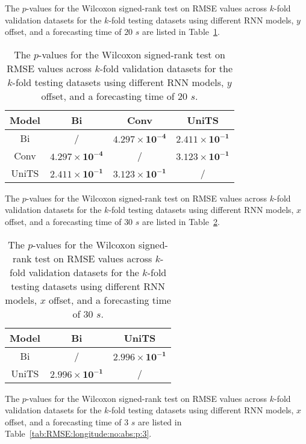 The $p$-values for the Wilcoxon signed-rank test on RMSE values across $k$-fold validation datasets for the $k$-fold testing datasets using different RNN models, $y$ offset, and a forecasting time of $20$ $s$ are listed in Table~\ref{tab:RMSE:latitude:no:abs:p:20}.

\begin{table}[!ht]
	\centering
	\begin{tabular}{|c|c|c|c|}
		\hline
		Model & Bi & Conv & UniTS \\ \hline
		Bi & / & $\mathbf{4.297 \times 10^{-4}}$ & $\mathbf{2.411 \times 10^{-1}}$ \\ \hline
		Conv & $\mathbf{4.297 \times 10^{-4}}$ & / & $\mathbf{3.123 \times 10^{-1}}$ \\ \hline
		UniTS & $\mathbf{2.411 \times 10^{-1}}$ & $\mathbf{3.123 \times 10^{-1}}$ & / \\ \hline
	\end{tabular}
	\caption{The $p$-values for the Wilcoxon signed-rank test on RMSE values across $k$-fold validation datasets for the $k$-fold testing datasets using different RNN models, $y$ offset, and a forecasting time of $20$ $s$.}
	\label{tab:RMSE:latitude:no:abs:p:20}
\end{table}

The $p$-values for the Wilcoxon signed-rank test on RMSE values across $k$-fold validation datasets for the $k$-fold testing datasets using different RNN models, $x$ offset, and a forecasting time of $30$ $s$ are listed in Table~\ref{tab:RMSE:longitude:no:abs:p:30}.

\begin{table}[!ht]
	\centering
	\begin{tabular}{|c|c|c|}
		\hline
		Model & Bi & UniTS \\ \hline
		Bi & / & $\mathbf{2.996 \times 10^{-1}}$ \\ \hline
		UniTS & $\mathbf{2.996 \times 10^{-1}}$ & / \\ \hline
	\end{tabular}
	\caption{The $p$-values for the Wilcoxon signed-rank test on RMSE values across $k$-fold validation datasets for the $k$-fold testing datasets using different RNN models, $x$ offset, and a forecasting time of $30$ $s$.}
	\label{tab:RMSE:longitude:no:abs:p:30}
\end{table}

The $p$-values for the Wilcoxon signed-rank test on RMSE values across $k$-fold validation datasets for the $k$-fold testing datasets using different RNN models, $x$ offset, and a forecasting time of $3$ $s$ are listed in Table~\ref{tab:RMSE:longitude:no:abs:p:3}.

